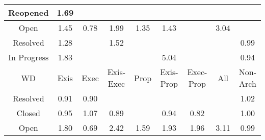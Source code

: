 \begin{tabular}{|c||c|c|c|c|c|c|c|c|}
\hline
Reopened & \cellcolor[rgb]{0.8876823966869445,0.8294285036938158,0.42} 1.69 &  &  &  &  &  &  &  \\ 
\hline
Open & \cellcolor[rgb]{0.8953390069415836,0.8330553190775922,0.42} 1.45 & \cellcolor[rgb]{0.8659121353643592,0.6313174407246336,0.37885132634006863} 0.78 & \cellcolor[rgb]{0.8780906253469003,0.8248850330590581,0.42} 1.99 & \cellcolor[rgb]{0.8987016669720499,0.8346481580393921,0.42} 1.35 & \cellcolor[rgb]{0.8962173583397341,0.8334713802661898,0.42} 1.43 &  & \cellcolor[rgb]{0.8438524336277674,0.8086669422447319,0.42} 3.04 &  \\ 
\hline
Resolved & \cellcolor[rgb]{0.9009560660168224,0.8357160312711264,0.42} 1.28 &  & \cellcolor[rgb]{0.8931212198048751,0.832004788328625,0.42} 1.52 &  &  &  &  & \cellcolor[rgb]{0.9079820347401832,0.8304482977702,0.4181165657575042} 0.99 \\ 
\hline
In Progress & \cellcolor[rgb]{0.883059975326467,0.827238935680958,0.42} 1.83 &  &  &  & \cellcolor[rgb]{0.7792506250733414,0.7780660855610564,0.41999999999999993} 5.04 &  &  & \cellcolor[rgb]{0.8985555744149083,0.7858297188972321,0.40931853612058094} 0.94 \\ 
\hline
\hline
WD & Exis & Exec & Exis-Exec & Prop & Exis-Prop & Exec-Prop & All & Non-Arch \\ 
\hline
Resolved & \cellcolor[rgb]{0.8914356605559907,0.7521287932983555,0.4026732831855912} 0.91 & \cellcolor[rgb]{0.8904828897932747,0.747619011688167,0.4017840304737231} 0.90 &  &  &  &  &  & \cellcolor[rgb]{0.909432996584543,0.8397314194347835,0.42} 1.02 \\ 
\hline
Closed & \cellcolor[rgb]{0.8990731497071168,0.7882795752803525,0.4098016063933089} 0.95 & \cellcolor[rgb]{0.9077370734091333,0.8389280874043262,0.42} 1.07 & \cellcolor[rgb]{0.8880685960799303,0.7361913547783362,0.39953068967460154} 0.89 &  & \cellcolor[rgb]{0.8983731526385109,0.784966255822285,0.4091482757959435} 0.94 & \cellcolor[rgb]{0.8740641726479509,0.6699037505336344,0.3864598944714209} 0.82 &  & \cellcolor[rgb]{0.9090387647735401,0.8354501532614229,0.4191028471219707} 1.00 \\ 
\hline
Open & \cellcolor[rgb]{0.8841780577285991,0.8277685536609154,0.42} 1.80 & \cellcolor[rgb]{0.8487743249872671,0.5501984716063976,0.3628560366547826} 0.69 & \cellcolor[rgb]{0.8640535971170814,0.8182359144238807,0.42} 2.42 & \cellcolor[rgb]{0.8909479436308381,0.8309753417198706,0.42} 1.59 & \cellcolor[rgb]{0.8800450746375137,0.8258108248282958,0.41999999999999993} 1.93 & \cellcolor[rgb]{0.879040342379218,0.8253348990217347,0.42} 1.96 & \cellcolor[rgb]{0.8415550157039254,0.8075786916492278,0.42} 3.11 & \cellcolor[rgb]{0.9072570919557909,0.8270169019240767,0.41743995249207144} 0.99 \\ 

\end{tabular}
